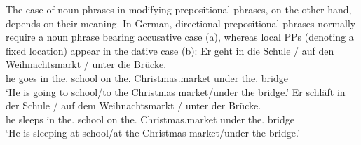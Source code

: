 {\eal
{}
\zl
The case of noun phrases in modifying prepositional phrases, on the other hand, depends on their meaning. In German, directional prepositional phrases
normally require a noun phrase bearing accusative case (a), whereas local PPs (denoting a
fixed location) appear in the dative case (b):
\eal
\ex
\gll Er geht in die Schule / auf den Weihnachtsmarkt / unter die Brücke.\\
	 he goes in the.\acc{} school {} on the.\acc{} Christmas.market {} under the.\acc{} bridge\\
\glt `He is going to school/to the Christmas market/under the bridge.'
\ex 
\gll Er schläft in der Schule / auf dem Weihnachtsmarkt / unter der Brücke.\\
	 he sleeps in the.\dat{} school {} on the.\dat{} Christmas.market {} under the.\dat{} bridge\\
\glt `He is sleeping at school/at the Christmas market/under the bridge.'
\zl

}
